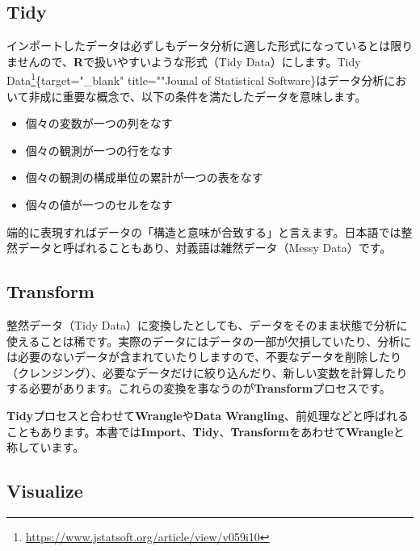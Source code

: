\documentclass[
  12pt,
]{book}
\DeclareRobustCommand{\href}[2]{#2\footnote{\url{#1}}}
\providecommand{\tightlist}{%
  \setlength{\itemsep}{0pt}\setlength{\parskip}{0pt}}
\begin{document}
\hypertarget{tidy}{%
\subsection*{Tidy}\label{tidy}}

インポートしたデータは必ずしもデータ分析に適した形式になっているとは限りませんので、\textbf{R}で扱いやすいような形式（Tidy Data）にします。\href{https://www.jstatsoft.org/article/view/v059i10}{Tidy Data}\{target="\_blank" title=""Jounal of Statistical Software\}はデータ分析において非成に重要な概念で、以下の条件を満たしたデータを意味します。

\begin{itemize}
\tightlist
\item
  個々の変数が一つの列をなす
\item
  個々の観測が一つの行をなす
\item
  個々の観測の構成単位の累計が一つの表をなす
\item
  個々の値が一つのセルをなす
\end{itemize}

端的に表現すればデータの「構造と意味が合致する」と言えます。日本語では整然データと呼ばれることもあり、対義語は雑然データ（Messy Data）です。

\hypertarget{transform}{%
\subsection*{Transform}\label{transform}}

整然データ（Tidy Data）に変換したとしても、データをそのまま状態で分析に使えることは稀です。実際のデータにはデータの一部が欠損していたり、分析には必要のないデータが含まれていたりしますので、不要なデータを削除したり（クレンジング）、必要なデータだけに絞り込んだり、新しい変数を計算したりする必要があります。これらの変換を事なうのが\textbf{Transform}プロセスです。

\textbf{Tidy}プロセスと合わせて\textbf{Wrangle}や\textbf{Data Wrangling}、前処理などと呼ばれることもあります。本書では\textbf{Import}、\textbf{Tidy}、\textbf{Transform}をあわせて\textbf{Wrangle}と称しています。

\hypertarget{visualize}{%
\subsection*{Visualize}\label{visualize}}
\end{document}
